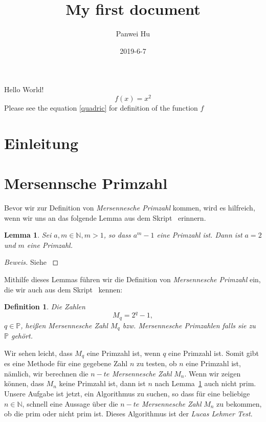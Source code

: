 \documentclass{article}
\title{My first document}
\date{2019-6-7}
\author{Panwei Hu}
\newtheorem{lemma}{Lemma}
\newtheorem{definition}{Definition}
\newcommand{\myparaDent}{12pt}
\newcommand{\Nature}{\ensuremath{\mathbb{N}}}
\begin{document}
  \maketitle
  \newpage
 \tableofcontents
	\newpage
  \newpage

  Hello World!
  \begin{equation}
  \label{quadric}
  	f(x) = x^2
  \end{equation}
Please see the equation \ref{quadric} for
definition of the function $f$
\newpage
\section{Einleitung}

\section{Mersennsche Primzahl}
Bevor wir zur Definition von \emph{Mersennesche Primzahl} kommen, wird es
hilfreich, wenn wir uns an das folgende Lemma aus dem Skript~\cite{script} erinnern.
\begin{lemma}\label{lem1}
	Sei $a,m \in \mathbb{N},m > 1$, so dass $a^m - 1$ eine Primzahl ist. Dann ist
	$a = 2$ und $m$ eine Primzahl.
\end{lemma}
\begin{proof}[Beweis]
Siehe \cite{script}
\end{proof}
Mithilfe dieses Lemmas f\"{u}hren wir die Definition von \emph{Mersennesche Primzahl} ein, die wir auch aus dem Skript~\cite{script} kennen:
\begin{definition}
Die Zahlen
\[
	M_{q} = 2^{q} - 1,
\]
$q \in \mathbb{P}$, hei{\ss}en \emph{Mersennesche Zahl} $M_{q}$ bzw. \emph{Mersennesche Primzahlen} falls sie zu $\mathbb{P}$ geh\"{o}rt.
\end{definition}
Wir sehen leicht, dass $M_{q}$ eine Primzahl ist, wenn $q$ eine Primzahl ist.
Somit gibt es eine Methode f\"{u}r eine gegebene Zahl $n$ zu testen, ob $n$ eine Primzahl ist, n\"{a}mlich, wir berechnen die $n-te$ \emph{Mersennesche Zahl} $M_{n}$. Wenn wir zeigen k\"{o}nnen, dass $M_{n}$ keine Primzahl ist, dann ist $n$ nach Lemma~\ref{lem1} auch nicht prim.\\[\myparaDent]
Unsere Aufgabe ist jetzt, ein Algorithmus zu suchen, so dass f\"{u}r eine beliebige $n \in \Nature$, schnell eine Aussage \"{u}ber die $n-te$ \emph{Mersennesche Zahl} $M_{n}$ zu bekommen, ob die prim oder nicht prim ist. Dieses Algorithmus ist der \emph{Lucas Lehmer Test}. 
\end{document}
